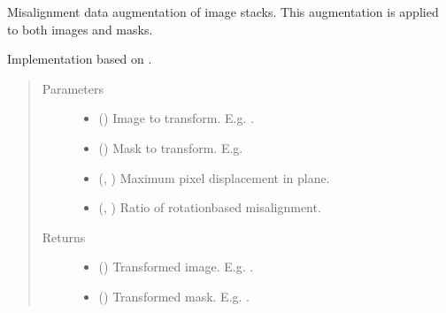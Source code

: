 \documentclass[letterpaper,10pt,english]{sphinxmanual}
\begin{document}
\begin{fulllineitems}
\label{\detokenize{data/generators/augmentors:data.generators.augmentors.misalignment}}
Mis\sphinxhyphen{}alignment data augmentation of image stacks. This augmentation is applied to both images and masks.

Implementation based on .
\begin{quote}\begin{description}
\item[{Parameters}] \leavevmode\begin{itemize}
\item {} 
 () \textendash{} Image to transform. E.g. .

\item {} 
 () \textendash{} Mask to transform. E.g. 

\item {} 
 (, ) \textendash{} Maximum pixel displacement in \sphinxhyphen{}plane.

\item {} 
 (, ) \textendash{} Ratio of rotation\sphinxhyphen{}based mis\sphinxhyphen{}alignment.

\end{itemize}

\item[{Returns}] \leavevmode
\begin{itemize}
\item {} 
 () \textendash{} Transformed image. E.g. .

\item {} 
 () \textendash{} Transformed mask. E.g. .


\end{itemize}
\end{description}
\end{quote}
\end{fulllineitems}
\end{document}
